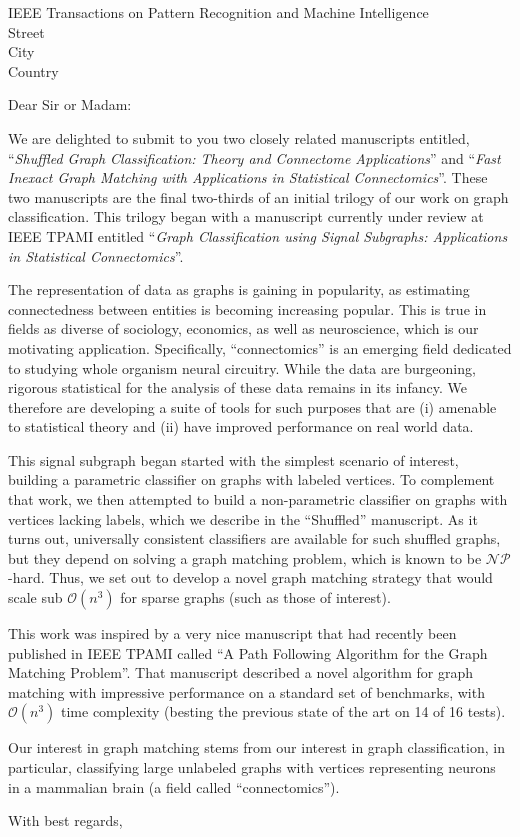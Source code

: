 \documentclass{letter}
\begin{document}
\begin{letter}{IEEE Transactions on Pattern Recognition and Machine Intelligence \\ Street\\ City\\ Country}
\opening{Dear Sir or Madam:}

We are delighted to submit to you two closely related manuscripts entitled, ``\emph{Shuffled Graph Classification: Theory and Connectome Applications}'' and ``\emph{Fast Inexact Graph Matching with Applications in Statistical Connectomics}''.  These two manuscripts are the final two-thirds of an initial trilogy of our work on graph classification.  This trilogy began with a manuscript currently under review at IEEE TPAMI entitled ``\emph{Graph Classification using Signal Subgraphs: Applications in Statistical Connectomics}''. 

The representation of data as graphs is gaining in popularity, as estimating connectedness between entities is becoming increasing popular.  This is true in fields as diverse of sociology, economics, as well as neuroscience, which is our motivating application.  Specifically, ``connectomics'' is an emerging field dedicated to studying whole organism neural circuitry.  While the data are burgeoning, rigorous statistical for the analysis of these data remains in its infancy.  We therefore are developing a suite of tools for such purposes that are (i) amenable to statistical theory and (ii) have improved performance on real world data.



This signal subgraph began started with the simplest scenario of interest, building a parametric classifier on graphs with labeled vertices.  To complement that work, we then attempted to build a non-parametric classifier on graphs with vertices lacking labels, which we describe in the ``Shuffled'' manuscript. As it turns out, universally consistent classifiers are available for such shuffled graphs, but they depend on solving a graph matching problem, which is known to be $\mathcal{NP}$-hard. Thus, we set out to develop a novel graph matching strategy that would scale sub $\mathcal{O}(n^3)$ for sparse graphs (such as those of interest).


This work was inspired by a very nice manuscript that had recently been published in IEEE TPAMI called ``A Path Following Algorithm for the Graph Matching Problem''.  That manuscript described a novel algorithm for graph matching with impressive performance on a standard set of benchmarks, with $\mathcal{O}(n^3)$ time complexity (besting the previous state of the art on 14 of 16 tests).   

Our interest in graph matching stems from our interest in graph classification, in particular, classifying large unlabeled graphs with vertices representing neurons in a mammalian brain (a field called ``connectomics'').  

\closing{With best regards,}
\end{letter}
\end{document}
